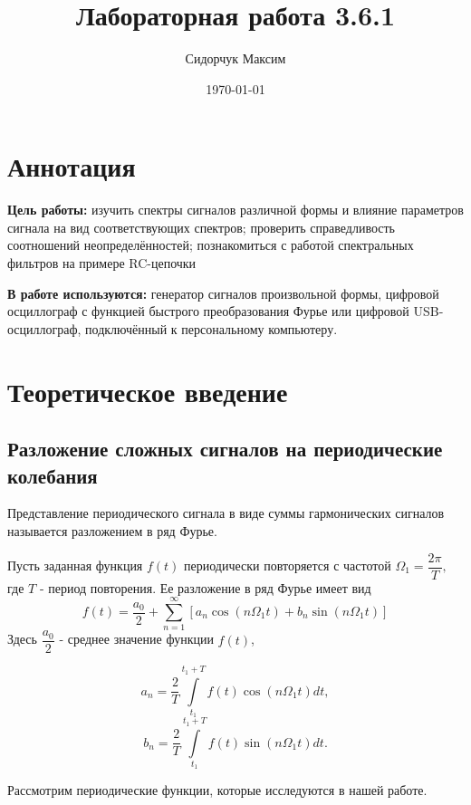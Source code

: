 \documentclass[a4paper,12pt]{article} %
\date{\today}
\title{Лабораторная работа 3.6.1}
\author{Сидорчук Максим}
\begin{document}
\maketitle
\section{Аннотация}
\indent
\indent \textbf{Цель работы:} изучить спектры сигналов различной формы и влияние параметров сигнала
на вид соответствующих спектров; проверить справедливость соотношений неопределённостей; познакомиться с работой спектральных фильтров на примере RC-цепочки

\indent \textbf{В работе используются:} генератор сигналов произвольной формы, цифровой осциллограф с функцией быстрого преобразования Фурье или цифровой USB-осциллограф, подключённый к персональному компьютеру.

\section{Теоретическое введение}

\subsection*{Разложение сложных сигналов на периодические колебания}
Представление периодического сигнала в виде суммы гармонических сигналов называется разложением в ряд Фурье.

Пусть заданная функция $f(t)$ периодически повторяется с частотой $\Omega_{1}=\dfrac{2\pi}{T},$ где $T$ - период повторения. Ее разложение в ряд Фурье имеет вид
\begin{equation}
	f(t)=\dfrac{a_{0}}{2}+ \sum\limits_{n=1}^\infty [a_{n}\cos(n \Omega_{1}t)+b_{n}\sin(n \Omega_{1} t) ]
	\label{eq1}
\end{equation}
Здесь $\dfrac{a_{0}}{2}$ - среднее значение функции $f(t)$,

\begin{equation}
	a_{n}=\dfrac{2}{T}\int\limits_{t_{1}}^{t_{1}+T}f(t)\cos(n \Omega_{1} t)dt,
	\label{eq2}
\end{equation}
\begin{equation}
	b_{n}=\dfrac{2}{T}\int\limits_{t_{1}}^{t_{1}+T}f(t)\sin(n \Omega_{1} t)dt.
	\label{eq3}
\end{equation}




Рассмотрим периодические функции, которые исследуются в нашей
работе.
\end{document}
